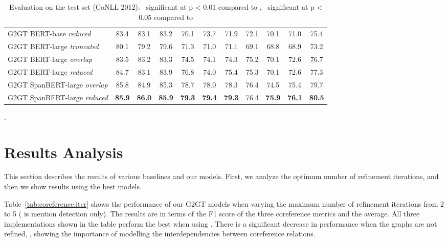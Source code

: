 \documentclass[11pt]{article}
\begin{document}
\begin{table*}[t]
\begin{adjustbox}{width=1\textwidth}
\begin{tabular}{l c c c | c c c | c c c | c }
			G2GT BERT-base \emph{reduced} & 83.4 & 83.1 & 83.2 & 70.1 & 73.7 & 71.9 & 72.1 & 70.1 & 71.0 & 75.4 \\ 
			G2GT BERT-large \emph{truncated} & 80.1 & 79.2 & 79.6 & 71.3 & 71.0 & 71.1 & 69.1 & 68.8 & 68.9 & 73.2 \\
			G2GT BERT-large \emph{overlap} & 83.5 & 83.2 & 83.3 & 74.5 & 74.1 & 74.3 & 75.2 & 70.1 & 72.6 & 76.7 \\
			G2GT BERT-large \emph{reduced} & 84.7 & 83.1 & 83.9 & 76.8 & 74.0 & 75.4 & 75.3 & 70.1 & 72.6 & 77.3 \\
			G2GT SpanBERT-large \emph{overlap} & 85.8 & 84.9 &85.3 & 78.7 &	78.0& 78.3 & 76.4 & 74.5 & 75.4 & 79.7 \\
			G2GT SpanBERT-large \emph{reduced} & \textbf{85.9}	&\textbf{86.0}&	\textbf{85.9}&	\textbf{79.3}&	\textbf{79.4}&	\textbf{79.3}&	76.4&	\textbf{75.9}&	\textbf{76.1}&	\textbf{80.5} \\ 
			\bottomrule 
		\end{tabular} 
	\end{adjustbox}  
	\caption{Evaluation on the test set (CoNLL 2012).~   significant at p < 0.01 compared to \citep{joshi-etal-2020-spanbert},~  significant at p < 0.05 compared to \citep{xu-choi-2020-revealing}}.
	\label{tab:coreference:results}
	
\end{table*}


\section{Results Analysis} 
\label{sec:coreference:results}
This section describes the results of various baselines and our models. 
First, we analyze the optimum number of refinement iterations, and then we show results using the best models.

Table~\ref{tab:coreference:iter} shows the performance of our G2GT models when varying the maximum number of refinement iterations  from 2 to 5 ( is mention detection only). The results are in terms of the F1 score of the three coreference metrics and the average. All three implementations shown in the table perform the best when using . There is a significant decrease in performance when the graphs are not refined, , showing the importance of modelling the interdependencies between coreference relations. 
\end{document}
